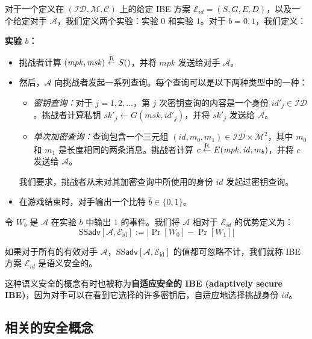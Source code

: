 \begin{game}[语义安全性]\label{game:15-4}
对于一个定义在 $(\mathcal{ID},\mathcal{M},\mathcal{C})$ 上的给定 IBE 方案 $\mathcal{E}_\mathit{id}=(S,G,E,D)$，以及一个给定对手 $\mathcal{A}$，我们定义两个实验：实验 $0$ 和实验 $1$。对于 $b=0,1$，我们定义：

\vspace{5pt}

\noindent\textbf{实验 $b$：}
\begin{itemize}
	\item 挑战者计算 $(\mathit{mpk},\mathit{msk})\overset{\rm R}\leftarrow S()$，并将 $\mathit{mpk}$ 发送给对手 $\mathcal{A}$。
	\item 然后，$\mathcal{A}$ 向挑战者发起一系列查询。每个查询可以是以下两种类型中的一种：
	\begin{itemize}
		\item \emph{密钥查询：}对于 $j=1,2,\dots$，第 $j$ 次密钥查询的内容是一个身份 $\mathit{id'}_j\in\mathcal{ID}$。挑战者计算私钥 $\mathit{sk'}_j\leftarrow G(\mathit{msk},\mathit{id'}_j)$，并将 $\mathit{sk'}_j$ 发送给 $\mathcal{A}$。
		\item \emph{单次加密查询：}查询包含一个三元组 $(\mathit{id},m_0,m_1)\in\mathcal{ID}\times\mathcal{M}^2$，其中 $m_0$ 和 $m_1$ 是长度相同的两条消息。挑战者计算 $c\overset{\rm R}\leftarrow E(\mathit{mpk},\mathit{id},m_b)$，并将 $c$ 发送给 $\mathcal{A}$。
	\end{itemize}
	我们要求，挑战者从未对其加密查询中所使用的身份 $\mathit{id}$ 发起过密钥查询。
	\item 在游戏结束时，对手输出一个比特 $\hat{b}\in\{0,1\}$。
\end{itemize}
令 $W_b$ 是 $\mathcal{A}$ 在实验 $b$ 中输出 $1$ 的事件。我们将 $\mathcal{A}$ 相对于 $\mathcal{E}_\mathit{id}$ 的优势定义为：
\[
\mathrm{SS}\mathsf{adv}[\mathcal{A},\mathcal{E}_\mathrm{id}]:=
\big\lvert
\Pr[W_0]-\Pr[W_1]
\big\rvert
\]
\end{game}

\begin{definition}\label{def:15-8}
如果对于所有的有效对手 $\mathcal{A}$，$\mathrm{SS}\mathsf{adv}[\mathcal{A},\mathcal{E}_\mathrm{id}]$ 的值都可忽略不计，我们就称 IBE 方案 $\mathcal{E}_\mathit{id}$ 是语义安全的。
\end{definition}

这种语义安全的概念有时也被称为\textbf{自适应安全的 IBE (adaptively secure IBE)}，因为对手可以在看到它选择的许多密钥后，自适应地选择挑战身份 $\mathit{id}$。

\subsection{相关的安全概念}\label{subsec:15-6-2}

